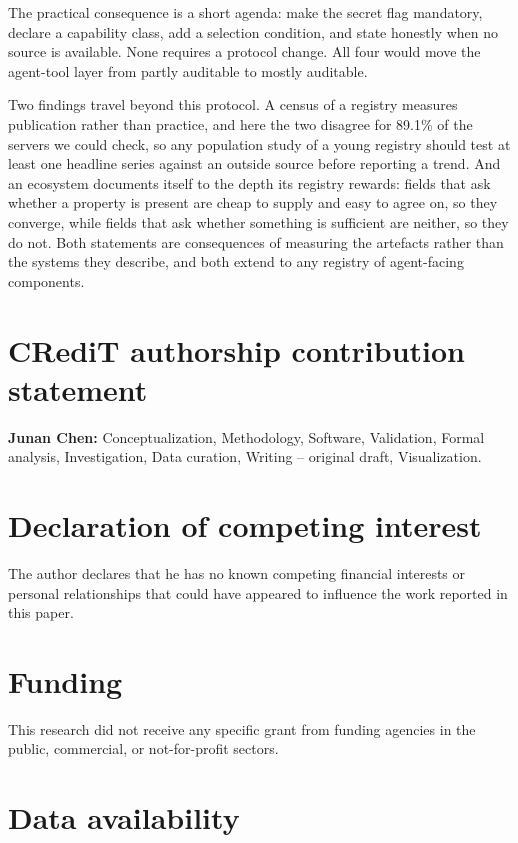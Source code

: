 \documentclass[a4paper,fleqn]{cas-dc}
\begin{document}
The practical consequence is a short agenda: make the secret flag mandatory,
declare a capability class, add a selection condition, and state honestly when
no source is available. None requires a protocol change. All four would move
the agent-tool layer from partly auditable to mostly auditable.

Two findings travel beyond this protocol. A census of a registry measures
publication rather than practice, and here the two disagree for 89.1\% of the
servers we could check, so any population study of a young registry should test
at least one headline series against an outside source before reporting a
trend. And an ecosystem documents itself to the depth its registry rewards:
fields that ask whether a property is present are cheap to supply and easy to
agree on, so they converge, while fields that ask whether something is
sufficient are neither, so they do not. Both statements are consequences of
measuring the artefacts rather than the systems they describe, and both extend
to any registry of agent-facing components.

\section*{CRediT authorship contribution statement}

\textbf{Junan Chen:} Conceptualization, Methodology, Software, Validation,
Formal analysis, Investigation, Data curation, Writing -- original draft,
Visualization.

\section*{Declaration of competing interest}

The author declares that he has no known competing financial interests or
personal relationships that could have appeared to influence the work reported
in this paper.

\section*{Funding}

This research did not receive any specific grant from funding agencies in the
public, commercial, or not-for-profit sectors.

\section*{Data availability}
\end{document}
